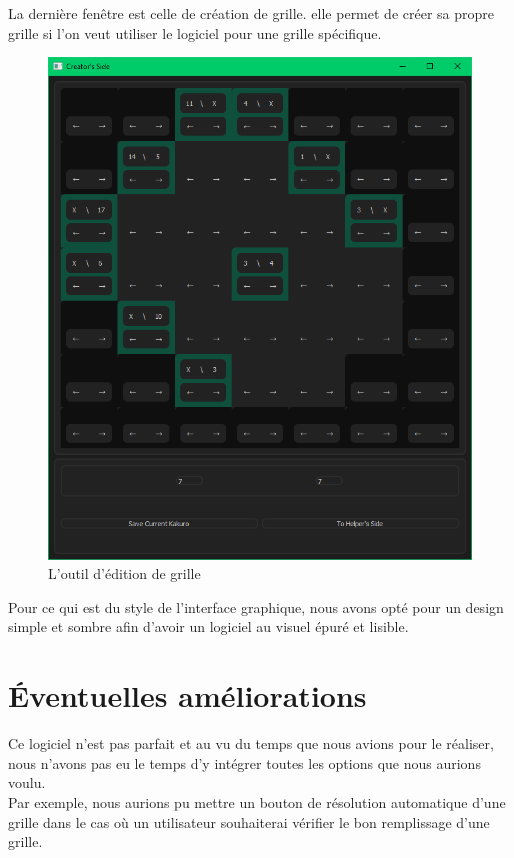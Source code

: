 \documentclass[12pt]{article}
\begin{document}
\newpage
La dernière fenêtre est celle de création de grille. elle permet de créer sa propre grille si l'on veut utiliser le logiciel pour une grille spécifique. 

 \begin{figure}[ht]
  \begin{center}
    \includegraphics[scale=0.4]{./ressources/creator.png} 
  \end{center}
  \caption{L'outil d'édition de grille}
\end{figure}
Pour ce qui est du style de l'interface graphique, nous avons opté pour un design simple et sombre afin d'avoir un logiciel au visuel épuré et lisible. 
\section{Éventuelles améliorations}
Ce logiciel n'est pas parfait et au vu du temps que nous avions pour le réaliser, nous n'avons pas eu le temps d'y intégrer toutes les options que nous aurions voulu. \\
Par exemple, nous aurions pu mettre un bouton de résolution automatique d'une grille dans le cas où un utilisateur souhaiterai vérifier le bon remplissage d'une grille. \\
\end{document}

